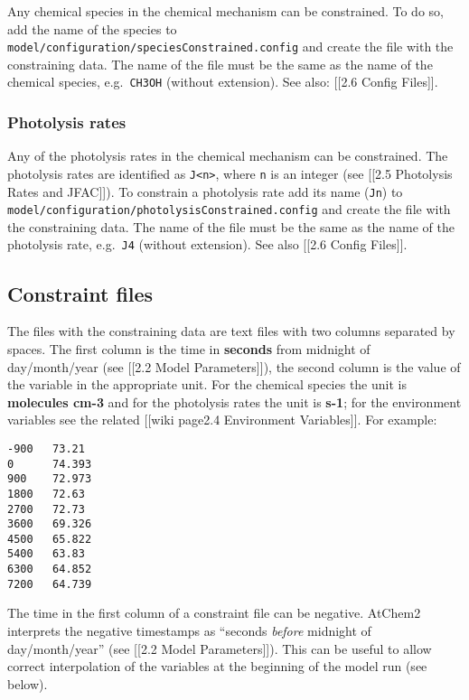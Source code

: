 Any chemical species in the chemical mechanism can be constrained. To do
so, add the name of the species to
\texttt{model/configuration/speciesConstrained.config} and create the
file with the constraining data. The name of the file must be the same
as the name of the chemical species, e.g.~\texttt{CH3OH} (without
extension). See also: {[}{[}2.6 Config Files{]}{]}.

\hypertarget{photolysis-rates}{%
\subsubsection{Photolysis rates}\label{photolysis-rates}}

Any of the photolysis rates in the chemical mechanism can be
constrained. The photolysis rates are identified as
\texttt{J\textless{}n\textgreater{}}, where \texttt{n} is an integer
(see {[}{[}2.5 Photolysis Rates and JFAC{]}{]}). To constrain a
photolysis rate add its name (\texttt{Jn}) to
\texttt{model/configuration/photolysisConstrained.config} and create the
file with the constraining data. The name of the file must be the same
as the name of the photolysis rate, e.g.~\texttt{J4} (without
extension). See also {[}{[}2.6 Config Files{]}{]}.

\hypertarget{constraint-files}{%
\subsection{Constraint files}\label{constraint-files}}

The files with the constraining data are text files with two columns
separated by spaces. The first column is the time in \textbf{seconds}
from midnight of day/month/year (see {[}{[}2.2 Model Parameters{]}{]}),
the second column is the value of the variable in the appropriate unit.
For the chemical species the unit is \textbf{molecules cm-3} and for the
photolysis rates the unit is \textbf{s-1}; for the environment variables
see the related {[}{[}wiki page\textbar{}2.4 Environment
Variables{]}{]}. For example:

\begin{verbatim}
-900   73.21
0      74.393
900    72.973
1800   72.63
2700   72.73
3600   69.326
4500   65.822
5400   63.83
6300   64.852
7200   64.739
\end{verbatim}

The time in the first column of a constraint file can be negative.
AtChem2 interprets the negative timestamps as ``seconds \emph{before}
midnight of day/month/year'' (see {[}{[}2.2 Model Parameters{]}{]}).
This can be useful to allow correct interpolation of the variables at
the beginning of the model run (see below).


